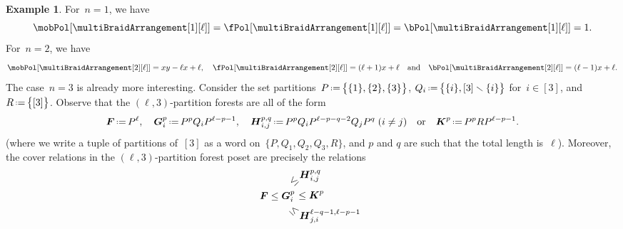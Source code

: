 \documentclass{amsart}
\theoremstyle{definition}
\newtheorem{example}[theorem]{Example}
\renewcommand{\b}[1]{{\boldsymbol{#1}}} %
\newcommand{\ssm}{\smallsetminus} %
\newcommand{\eqdef}{\mbox{\,\raisebox{0.2ex}{\scriptsize\ensuremath{\mathrm:}}\ensuremath{=}\,}} %
\renewcommand{\b}[1]{\boldsymbol{#1}} %
\begin{document}
\begin{example}
For~$n = 1$, we have
\[
\mobPol[{\multiBraidArrangement[1][\ell]}] = \fPol[{\multiBraidArrangement[1][\ell]}] = \bPol[{\multiBraidArrangement[1][\ell]}] = 1.
\]
For~$n = 2$, we have
\[
\mobPol[{\multiBraidArrangement[2][\ell]}] = xy-\ell x+\ell,
\quad
\fPol[{\multiBraidArrangement[2][\ell]}] = (\ell+1)x+\ell
\quad\text{and}\quad
\bPol[{\multiBraidArrangement[2][\ell]}] = (\ell-1)x+\ell.
\]
The case~$n = 3$ is already more interesting.
Consider the set partitions~$P \eqdef \big\{ \{1\}, \{2\}, \{3\} \big\}$, $Q_i \eqdef \big\{ \{i\}, [3] \ssm \{i\} \big\}$ for~$i \in [3]$, and~$R \eqdef \big\{ [3] \big\}$.
Observe that the $(\ell,3)$-partition forests are all of the form
\begin{gather*}
\b{F} \eqdef P^\ell,
\quad
\b{G}_i^p \eqdef P^p Q_i P^{\ell-p-1}, %
\quad
\b{H}_{i,j}^{p,q} \eqdef P^p Q_i P^{\ell-p-q-2} Q_j P^q \;\text{($i \ne j$)} %
\quad\text{or}\quad
\b{K}^p \eqdef P^p R P^{\ell-p-1}. %
\end{gather*}
(where we write a tuple of partitions of~$[3]$ as a word on~$\{P, Q_1, Q_2, Q_3, R\}$, and $p$ and $q$ are such that the total length is~$\ell$).
Moreover, the cover relations in the $(\ell,3)$-partition forest poset are precisely the relations
\[
\b{F} \le \b{G}_i^p \hspace{-.4cm} \begin{array}{l} \rotatebox[origin=c]{45}{$\le$} \raisebox{.2cm}{$\b{H}_{i,j}^{p,q}$} \\[.1cm] \quad \le \b{K}^p \\[.1cm] \rotatebox[origin=c]{-45}{$\le$} \raisebox{-.2cm}{$\b{H}_{j,i}^{\ell-q-1, \ell-p-1}$} \end{array}
\]
\end{example}
\end{document}
